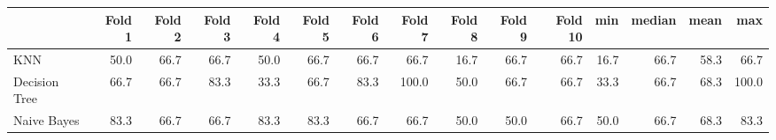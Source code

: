 \begin{tabular}{lrrrrrrrrrrrrrr}
\toprule
{} & Fold 1 & Fold 2 & Fold 3 & Fold 4 & Fold 5 & Fold 6 & Fold 7 & Fold 8 & Fold 9 & Fold 10 &   min & median &  mean &    max \\
\midrule
KNN           & 50.0 & 66.7 & 66.7 & 50.0 & 66.7 & 66.7 & 66.7 & 16.7 & 66.7 & 66.7 & 16.7 & 66.7 & 58.3 & 66.7 \\
Decision Tree & 66.7 & 66.7 & 83.3 & 33.3 & 66.7 & 83.3 & 100.0 & 50.0 & 66.7 & 66.7 & 33.3 & 66.7 & 68.3 & 100.0 \\
Naive Bayes   & 83.3 & 66.7 & 66.7 & 83.3 & 83.3 & 66.7 & 66.7 & 50.0 & 50.0 & 66.7 & 50.0 & 66.7 & 68.3 & 83.3 \\
\bottomrule
\end{tabular}

